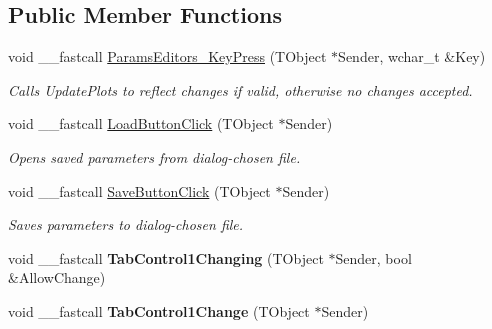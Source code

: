 \subsection*{Public Member Functions}
\begin{DoxyCompactItemize}
\item 
\hypertarget{class_t_h_h2_current_form_ad93f10ac76f8ff6cc1ee6333775b487f}{void \+\_\+\+\_\+fastcall \hyperlink{class_t_h_h2_current_form_ad93f10ac76f8ff6cc1ee6333775b487f}{Params\+Editors\+\_\+\+Key\+Press} (T\+Object $\ast$Sender, wchar\+\_\+t \&Key)}\label{class_t_h_h2_current_form_ad93f10ac76f8ff6cc1ee6333775b487f}

\begin{DoxyCompactList}\small\item\em Calls Update\+Plots to reflect changes if valid, otherwise no changes accepted. \end{DoxyCompactList}\item 
\hypertarget{class_t_h_h2_current_form_a5f54ce69eef294d3b8e858bd69dca8f0}{void \+\_\+\+\_\+fastcall \hyperlink{class_t_h_h2_current_form_a5f54ce69eef294d3b8e858bd69dca8f0}{Load\+Button\+Click} (T\+Object $\ast$Sender)}\label{class_t_h_h2_current_form_a5f54ce69eef294d3b8e858bd69dca8f0}

\begin{DoxyCompactList}\small\item\em Opens saved parameters from dialog-\/chosen file. \end{DoxyCompactList}\item 
\hypertarget{class_t_h_h2_current_form_a45af940d1fac9b4aa47f363dcc82b576}{void \+\_\+\+\_\+fastcall \hyperlink{class_t_h_h2_current_form_a45af940d1fac9b4aa47f363dcc82b576}{Save\+Button\+Click} (T\+Object $\ast$Sender)}\label{class_t_h_h2_current_form_a45af940d1fac9b4aa47f363dcc82b576}

\begin{DoxyCompactList}\small\item\em Saves parameters to dialog-\/chosen file. \end{DoxyCompactList}\item 
\hypertarget{class_t_h_h2_current_form_a1a95a919832e6ac46f3dbb0d1c34f0ee}{void \+\_\+\+\_\+fastcall {\bfseries Tab\+Control1\+Changing} (T\+Object $\ast$Sender, bool \&Allow\+Change)}\label{class_t_h_h2_current_form_a1a95a919832e6ac46f3dbb0d1c34f0ee}

\item 
\hypertarget{class_t_h_h2_current_form_a460d32fb79ac8386109c3f43af6bc26a}{void \+\_\+\+\_\+fastcall {\bfseries Tab\+Control1\+Change} (T\+Object $\ast$Sender)}\label{class_t_h_h2_current_form_a460d32fb79ac8386109c3f43af6bc26a}


\end{DoxyCompactItemize}

